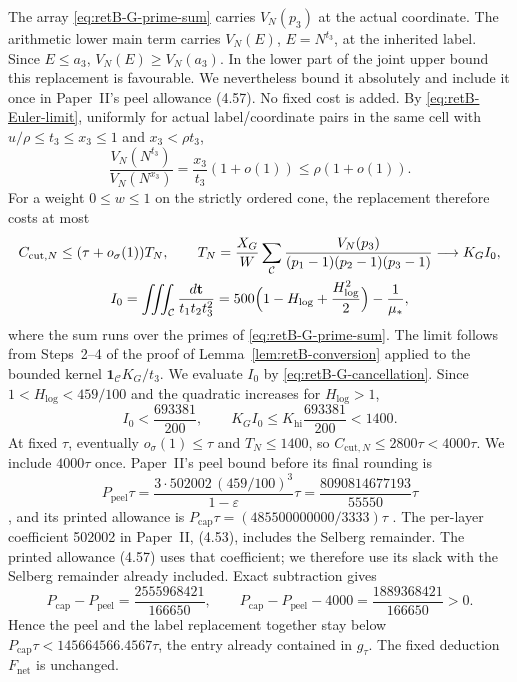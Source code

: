 The array \eqref{eq:retB-G-prime-sum} carries $V_N(p_3)$ at the actual
coordinate. The arithmetic lower main term carries $V_N(E)$,
$E=N^{t_3}$, at the inherited label. Since $E\le a_3$, $V_N(E)\ge V_N(a_3)$.
In the lower part of the joint upper bound this replacement is
favourable. We nevertheless bound it absolutely and include it once in
Paper~II's peel allowance (4.57). No fixed cost is added.
By \eqref{eq:retB-Euler-limit}, uniformly for actual label/coordinate pairs in the same cell with $u/\rho\le t_3\le x_3\le1$ and $x_3<\rho t_3$,
\[
 \frac{V_N(N^{t_3})}{V_N(N^{x_3})}=\frac{x_3}{t_3}(1+o(1))\le\rho(1+o(1)).
\]
For a weight $0\le w\le1$ on the strictly ordered cone, the replacement
therefore costs at most
\begin{equation}\label{eq:retB-label-cost}
\begin{gathered}
 C_{\mathrm{cut},N}\le(\tau+o_\sigma(1))T_N,\qquad
 T_N=\frac{X_G}W\sum_{\mathcal C}
       \frac{V_N(p_3)}{(p_1-1)(p_2-1)(p_3-1)}\longrightarrow K_GI_0,\\
 I_0=\iiint_{\mathcal C}\frac{d\mathbf t}{t_1t_2t_3^2}
    =500\Bigl(1-H_{\log}+\frac{H_{\log}^2}2\Bigr)-\frac1{\mu_*},
\end{gathered}
\end{equation}
where the sum runs over the primes of \eqref{eq:retB-G-prime-sum}. The limit
follows from Steps~2--4 of the proof of Lemma~\ref{lem:retB-conversion}
applied to the bounded kernel $\mathbf 1_{\mathcal C}K_G/t_3$. We evaluate $I_0$
by \eqref{eq:retB-G-cancellation}. Since $1<H_{\log}<459/100$ and
the quadratic increases for $H_{\log}>1$,
\[
 I_0<\frac{693381}{200},\qquad
 K_GI_0\le K_{\mathrm{hi}}\frac{693381}{200}<1400.
\]
At fixed $\tau$, eventually $o_\sigma(1)\le\tau$ and $T_N\le1400$, so
$C_{\mathrm{cut},N}\le2800\tau<4000\tau$. We include $4000\tau$ once.
Paper~II's peel bound before its final rounding is
\[
 P_{\mathrm{peel}}\tau=\frac{3\cdot502002\,(459/100)^3}{1-\varepsilon}\tau
 =\frac{8090814677193}{55550}\tau
\]
\cite[(4.47), (4.56)]{PaperII}, and its printed allowance is
$P_{\mathrm{cap}}\tau=(485500000000/3333)\tau$ \cite[(4.57)]{PaperII}.
The per-layer coefficient 502002 in Paper~II, (4.53), includes the
Selberg remainder. The printed allowance (4.57) uses that coefficient;
we therefore use its slack with the Selberg remainder already included.
Exact subtraction gives
\begin{equation}\label{eq:retB-peel-room}
 P_{\mathrm{cap}}-P_{\mathrm{peel}}=\frac{2555968421}{166650},\qquad
 P_{\mathrm{cap}}-P_{\mathrm{peel}}-4000=\frac{1889368421}{166650}>0.
\end{equation}
Hence the peel and the label replacement together stay below
$P_{\mathrm{cap}}\tau<145664566.4567\tau$, the entry already contained in
$g_\tau$. The fixed deduction $F_{\mathrm{net}}$ is unchanged.

